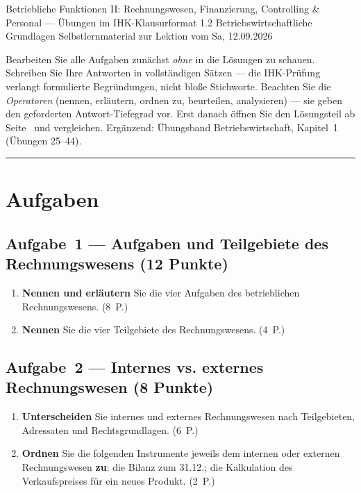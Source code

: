 \documentclass[11pt, a4paper]{article}
\begin{document}
%
  {Betriebliche Funktionen II: Rechnungswesen, Finanzierung, Controlling \& Personal --- Übungen im IHK-Klausurformat}%
  {1.2 Betriebswirtschaftliche Grundlagen}%
  {Selbstlernmaterial zur Lektion vom Sa, 12.09.2026}


\begin{merksatz}[title={\bfseries So nutzen Sie dieses Aufgabenheft}]
Bearbeiten Sie alle Aufgaben zunächst \emph{ohne} in die Lösungen zu schauen. Schreiben
Sie Ihre Antworten in vollständigen Sätzen --- die IHK-Prüfung verlangt formulierte
Begründungen, nicht bloße Stichworte. Beachten Sie die \emph{Operatoren} (nennen,
erläutern, ordnen zu, beurteilen, analysieren) --- sie geben den geforderten
Antwort-Tiefegrad vor. Erst danach öffnen Sie den Lösungsteil ab
Seite~\pageref{loesungen} und vergleichen. Ergänzend: Übungsband Betriebswirtschaft,
Kapitel~1 (Übungen 25--44).
\end{merksatz}

\tableofcontents
\vspace{1em}
\hrule

\section{Aufgaben}

\subsection*{Aufgabe~1 --- Aufgaben und Teilgebiete des Rechnungswesens (12 Punkte)}

\begin{enumerate}[label=(\alph*)]
  \item \textbf{Nennen und erläutern} Sie die vier Aufgaben des betrieblichen
    Rechnungswesens. \hfill (8~P.)
  \item \textbf{Nennen} Sie die vier Teilgebiete des Rechnungswesens. \hfill (4~P.)
\end{enumerate}

\subsection*{Aufgabe~2 --- Internes vs. externes Rechnungswesen (8 Punkte)}

\begin{enumerate}[label=(\alph*)]
  \item \textbf{Unterscheiden} Sie internes und externes Rechnungswesen nach Teilgebieten,
    Adressaten und Rechtsgrundlagen. \hfill (6~P.)
  \item \textbf{Ordnen} Sie die folgenden Instrumente jeweils dem internen oder externen
    Rechnungswesen \textbf{zu}: die Bilanz zum 31.12.; die Kalkulation des Verkaufspreises
    für ein neues Produkt. \hfill (2~P.)
\end{enumerate}
\end{document}
